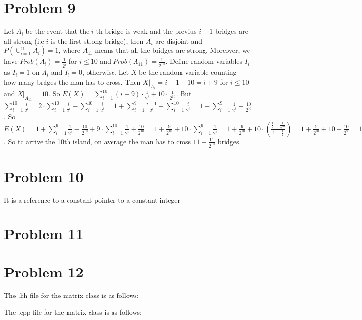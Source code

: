 \documentclass[12pt]{amsart}
\begin{document}
\section{Problem 9}
Let $A_i$ be the event that the $i$-th bridge is weak and the previus $i-1$ bridges are all strong (i.e $i$ is the first strong bridge), then $A_i$ are disjoint and $P(\cup_{i=1}^{11}A_i)=1$, where $A_{11}$ means that all the bridges are strong. Moreover, we have $Prob(A_i)=\frac{1}{2^i}$ for $i\leq 10$ and $Prob(A_{11})=\frac{1}{2^{10}}$. Define random variables $I_i$ as $I_i=1$ on $A_i$ and $I_i=0$, otherwise. Let $X$ be the random variable counting how many brdges the man has to cross. Then $X|_{A_i}=i-1+10=i+9$ for $i\leq 10$ and $X|_{A_{11}}=10$. So $E(X)=\sum_{i=1}^{10}(i+9)\cdot\frac{1}{2^i}+10\cdot\frac{1}{2^{10}}$. But $\sum_{i=1}^{10}\frac{i}{2^i}=2\cdot \sum_{i=1}^{10}\frac{i}{2^i} - \sum_{i=1}^{10}\frac{i}{2^i}=1+\sum_{i=1}^{9}\frac{i+1}{2^i}-\sum_{i=1}^{10}\frac{i}{2^i}=1+\sum_{i=1}^9\frac{1}{2^i}-\frac{10}{2^{10}}$. So $E(X)= 1+\sum_{i=1}^9\frac{1}{2^i}-\frac{10}{2^{10}}+9\cdot\sum_{i=1}^{10}\frac{1}{2^i}+\frac{10}{2^{10}}=1+\frac{9}{2^{10}}+10\cdot\sum_{i=1}^9\frac{1}{2^i}=1+\frac{9}{2^{10}}+10\cdot(\frac{\frac{1}{2}-\frac{1}{2^{10}}}{1-\frac{1}{2}})=1+\frac{9}{2^{10}}+10-\frac{10}{2^9}=11-\frac{11}{2^{10}}$. So to arrive the 10th island, on average the man has to cross $11-\frac{11}{2^{10}}$ bridges.




\section{Problem 10}
It is a reference to a constant pointer to a constant integer.


\section{Problem 11}
\begin{framed}

\end{framed}



\section{Problem 12}
The .hh file for the matrix class is as follows:
\begin{framed}

\end{framed}
The .cpp file for the matrix class is as follows:
\begin{framed}

\end{framed}
\end{document}
